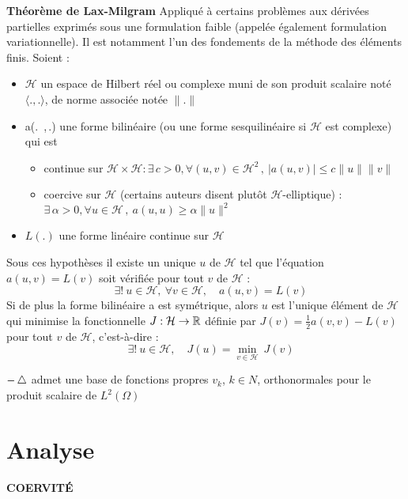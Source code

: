 \documentclass[openany]{book}
\begin{document}
\textbf{Th\'eor\`eme de Lax-Milgram}\newline
Appliqu\'e \`a certains probl\`emes aux d\'eriv\'ees partielles exprim\'es sous une formulation faible (appel\'ee \'egalement formulation variationnelle). Il est notamment l'un des fondements de la m\'ethode des \'el\'ements finis.
Soient :
\begin{itemize}
		\item $\mathcal{H}$ un espace de Hilbert r\'eel ou complexe muni de son produit scalaire not\'e $\langle.,.\rangle$, de norme associ\'ee not\'ee $\|.\|$
		\item a(.\, ,\,.) une forme bilin\'eaire (ou une forme sesquilin\'eaire si $\mathcal{H}$ est complexe) qui est
				\begin{itemize}
						\item continue sur $\mathcal{H}\times\mathcal{H} : \exists\,c>0, \forall (u,v)\in \mathcal{H}^2\,,\ |a(u,v)|\leq c\|u\|\|v\|$
						\item coercive sur $\mathcal{H}$ (certains auteurs disent plut\^ot $\mathcal{H}$-elliptique) : $\exists\,\alpha>0, \forall u\in\mathcal{H}\,,\ a(u,u) \geq \alpha\|u\|^2$
				\end{itemize}
		\item $L(.)$ une forme lin\'eaire continue sur $\mathcal{H}$
\end{itemize}
Sous ces hypoth\`eses il existe un unique $u$ de $\mathcal{H}$ tel que l'\'equation $a(u,v)=L(v)$ soit v\'erifi\'ee pour tout $v$ de $\mathcal{H}$ :
$$
\quad \exists!\ u \in \mathcal{H},\ \forall v\in\mathcal{H},\quad a(u,v)=L(v)
$$
Si de plus la forme bilin\'eaire a est sym\'etrique, alors  $u$  est l'unique \'el\'ement de $\mathcal{H}$ qui minimise la fonctionnelle $J:\mathcal{H}\rightarrow\mathbb{R}$ d\'efinie par $J(v) = \tfrac{1}{2}a(v,v)-L(v)$ pour tout $v$ de $\mathcal{H}$, c'est-\`a-dire :
$$
\quad \exists!\ u \in \mathcal{H},\quad J(u) = \min_{v\in\mathcal{H}}\ J(v)
$$
\bigskip

$-\mathop{}\!\mathbin\bigtriangleup $ admet une base de fonctions propres $v_k$, $k \in N$,
orthonormales pour le produit scalaire de $L^2(\Omega)$
\chapter{Analyse}

\textbf{COERVIT\'E}
\end{document}
